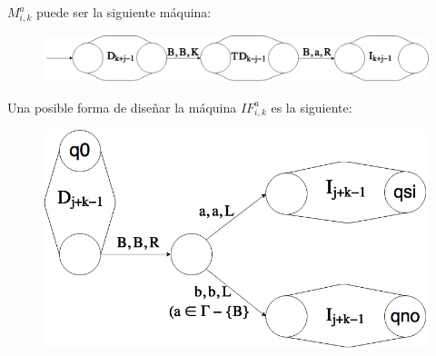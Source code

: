 \begin{frame}
  \PN $M_{i,k}^{a}$ puede ser la siguiente máquina:
  \begin{figure}[h]
    \centering
    \includegraphics[scale=0.33]{graphics/figure_4.png}
  \end{figure}

  \PN Una posible forma de diseñar la máquina $IF_{i,k}^{a}$ es la siguiente:
  \begin{figure}[h]
    \centering
    \includegraphics[scale=0.3]{graphics/figure_2.png}
  \end{figure}
\end{frame}
